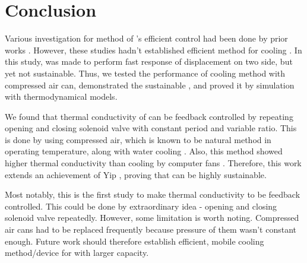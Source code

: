 \section{Conclusion}
Various investigation for method of \scpnospace's efficient control had been done by prior works \cite{haines,mirvakili,yip}. %
However, these studies hadn't established efficient method for cooling \scpnospace. %
In this study, \anta was made to perform fast response of displacement on two side, but yet not sustainable. Thus, we tested the performance of cooling method with compressed air can, demonstrated the sustainable \apcnospace, and proved it by simulation with thermodynamical models. %

We found that thermal conductivity of \scp can be feedback controlled by repeating opening and closing solenoid valve with constant period and variable ratio. %
This is done by using compressed air, which is known to be natural method in operating temperature, along with water cooling \cite{madden}.
Also, this method showed higher thermal conductivity than cooling by computer fans \cite{yip}.
Therefore, this work extends an achievement of Yip \etal, proving that \apc can be highly sustainable.

Most notably, this is the first study to make thermal conductivity to be feedback controlled. This could be done by extraordinary idea - opening and closing solenoid valve repeatedly.
However, some limitation is worth noting. 
Compressed air cans had to be replaced frequently because pressure of them wasn't constant enough. 
Future work should therefore establish efficient, mobile cooling method/device for \scp with larger capacity.



